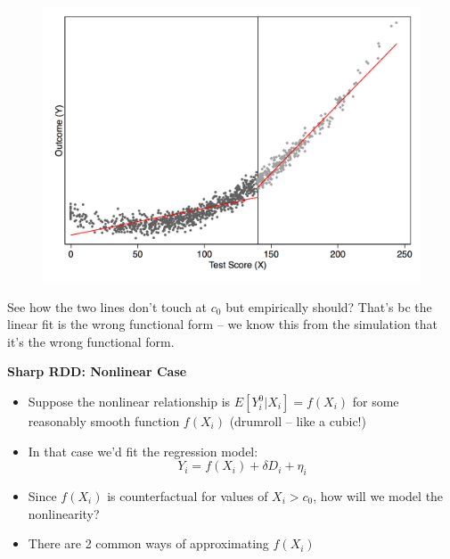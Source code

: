 \documentclass[notes=show]{beamer}
\begin{document}
\begin{frame}[plain]

 

\end{frame}

\begin{frame}[plain]
	
	\begin{figure}
	\includegraphics[scale=0.25]{./lecture_includes/bias_ex.png}
	\end{figure}

See how the two lines don't touch at $c_0$ but empirically should? That's bc the linear fit is the wrong functional form -- we know this from the simulation that it's the wrong functional form.
\end{frame}



\begin{frame}[plain]
	\begin{center}
	\textbf{Sharp RDD: Nonlinear Case}
	\end{center}
	
	\begin{itemize}
	\item Suppose the nonlinear relationship is $E[Y_i^0 | X_i]=f(X_i)$ for some reasonably smooth function $f(X_i)$ (drumroll -- like a cubic!) 
	\item In that case we'd fit the regression model:$$Y_i=f(X_i) + \delta{D_i} + \eta_i$$
	\item Since $f(X_i)$ is counterfactual for values of $X_i>c_0$, how will we model the nonlinearity? 
	\item There are 2 common ways of approximating $f(X_i)$	
	\end{itemize}
\end{frame}
\end{document}
